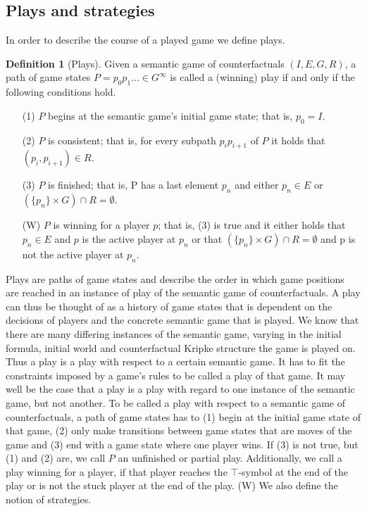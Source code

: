 \documentclass[a4paper,american,10pt]{paper}
\theoremstyle{definition}\newtheorem{definition}{Definition}
\begin{document}
\subsection{Plays and strategies}
In order to describe the course of a played game we define plays.
\begin{definition}[Plays]
Given a semantic game of counterfactuals $(I, E, G, R)$, a path of game states $P=p_0p_1...\in G^{\infty}$ is called a (winning) play if and only if the following conditions hold.
\begin{itemize}
	\item[(1)] $P$ begins at the semantic game's initial game state; that is, $p_0=I$.
	\item[(2)] $P$ is consistent; that is, for every subpath $p_ip_{i+1}$ of $P$ it holds that $(p_{i},p_{i+1})\in R$.
	\item[(3)] $P$ is finished; that is, P has a last element $p_n$ and either $p_n\in E$ or $(\{p_n\}\times G)\cap R = \emptyset$.
	\item[(W)] $P$ is winning for a player $p$; that is, (3) is true and it either holds that $p_n\in E$ and $p$ is the active player at $p_n$ or that $(\{p_n\}\times G)\cap R = \emptyset$ and p is not the active player at $p_n$.
\end{itemize}
\end{definition}
Plays are paths of game states and describe the order in which game positions are reached in an instance of play of the semantic game of counterfactuals. A play can thus be thought of as a history of game states that is dependent on the decisions of players and the concrete semantic game that is played. We know that there are many differing instances of the semantic game, varying in the initial formula, initial world and counterfactual Kripke structure the game is played on. Thus a play is a play with respect to a certain semantic game. It has to fit the constraints imposed by a game's rules to be called a play of that game. It may well be the case that a play is a play with regard to one instance of the semantic game, but not another. To be called a play with respect to a semantic game of counterfactuals, a path of game states has to (1) begin at the initial game state of that game, (2) only make transitions between game states that are moves of the game and (3) end with a game state where one player wins. If (3) is not true, but (1) and (2) are, we call $P$ an unfinished or partial play. Additionally, we call a play winning for a player, if that player reaches the $\top$-symbol at the end of the play or is not the stuck player at the end of the play. (W) We also define the notion of strategies.
\end{document}
